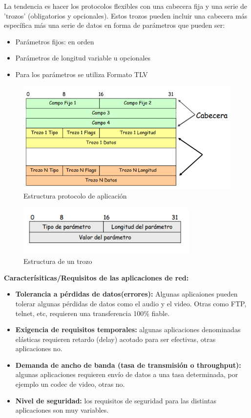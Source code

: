 \documentclass[a4paper,11pt]{article}
\begin{document}
La tendencia es hacer los protocolos flexibles con una cabecera fija y una serie de 'trozos' (obligatorios y opcionales). Estos trozos pueden incluir una cabecera más específica más una serie de datos en forma de parámetros que pueden ser:

\begin{itemize}
\item Parámetros fijos: en orden
\item Parámetros de longitud variable u opcionales
\item Para los parámetros se utiliza Formato TLV
\end{itemize}

\begin{figure}[h]
\centering
\includegraphics[scale=1,width=1.2\textwidth]{protocolos_aplicacion.png}
\caption{Estructura protocolo de aplicación}
\end{figure}

\begin{figure}[h]
\centering
\includegraphics[scale=1,width=0.8\textwidth]{trozo_protocolo.png}
\caption{Estructura de un trozo}
\end{figure}

\textbf{Caracterísiticas/Requisitos de las aplicaciones de red:}
\begin{itemize}
\item \textbf{Tolerancia a pérdidas de datos(errores):} Algunas aplicaiones pueden tolerar algunas pérdidas de datos como el audio y el video. Otras como FTP, telnet, etc, requieren una transferencia 100\% fiable.
\item \textbf{Exigencia de requisitos temporales:} algunas aplicaciones denominadas elásticas requieren retardo (delay) acotado para ser efectivas, otras aplicaciones no.
\item \textbf{Demanda de ancho de banda (tasa de transmisión o throughput):} algunas aplicaciones requieren envío de datos a una tasa determinada, por ejemplo un codec de video, otras no.
\item \textbf{Nivel de seguridad:} los requisitos de seguridad para las distintas aplicaciones son muy variables.
\end{itemize}
\end{document}
